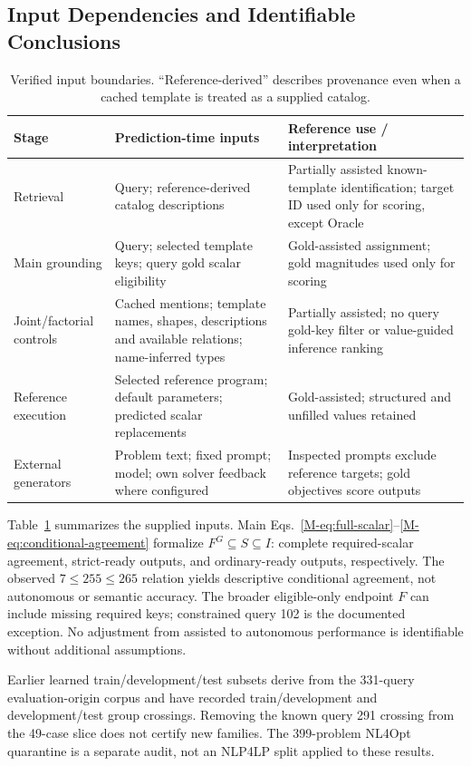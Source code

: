 \subsection{Input Dependencies and Identifiable Conclusions}
\label{app:input-dependencies}
\begin{table}[htbp]
\centering\small
\caption{Verified input boundaries. ``Reference-derived'' describes
provenance even when a cached template is treated as a supplied catalog.}
\label{tab:input-dependencies}
\begin{tabularx}{\linewidth}{@{}lXX@{}}
\toprule
Stage & Prediction-time inputs & Reference use / interpretation\\
\midrule
Retrieval & Query; reference-derived catalog descriptions & Partially assisted known-template identification; target ID used only for scoring, except Oracle\\
Main grounding & Query; selected template keys; query gold scalar eligibility & Gold-assisted assignment; gold magnitudes used only for scoring\\
Joint/factorial controls & Cached mentions; template names, shapes, descriptions and available relations; name-inferred types & Partially assisted; no query gold-key filter or value-guided inference ranking\\
Reference execution & Selected reference program; default parameters; predicted scalar replacements & Gold-assisted; structured and unfilled values retained\\
External generators & Problem text; fixed prompt; model; own solver feedback where configured & Inspected prompts exclude reference targets; gold objectives score outputs\\
\bottomrule
\end{tabularx}
\end{table}

Table~\ref{tab:input-dependencies} summarizes the supplied inputs. Main Eqs.~\eqref{M-eq:full-scalar}--\eqref{M-eq:conditional-agreement} formalize $F^G\subseteq S\subseteq I$: complete required-scalar agreement, strict-ready outputs, and ordinary-ready outputs, respectively. The observed $7\leq255\leq265$ relation yields descriptive conditional agreement, not autonomous or semantic accuracy. The broader eligible-only endpoint $F$ can include missing required keys; constrained query 102 is the documented exception. No adjustment from assisted to autonomous performance is identifiable without additional assumptions.

Earlier learned train/development/test subsets derive from the 331-query evaluation-origin corpus and have recorded train/development and development/test group crossings. Removing the known query 291 crossing from the 49-case slice does not certify new families. The 399-problem NL4Opt quarantine is a separate audit, not an NLP4LP split applied to these results.

